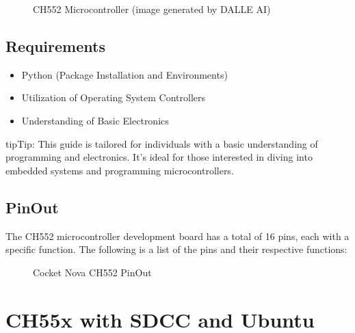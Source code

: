 \documentclass[letterpaper,10pt,english]{sphinxmanual}
\begin{document}
\begin{figure}[htbp]
\centering
\capstart

\noindent{}
\caption{CH552 Microcontroller (image generated by DALLE AI)}\label{\detokenize{about:id2}}\label{\detokenize{about:ch552}}\end{figure}


\section{Requirements}
\label{\detokenize{about:requirements}}\begin{itemize}
\item {} 
\sphinxAtStartPar
Python (Package Installation and Environments)

\item {} 
\sphinxAtStartPar
Utilization of Operating System Controllers

\item {} 
\sphinxAtStartPar
Understanding of Basic Electronics

\end{itemize}

\begin{sphinxadmonition}{tip}{Tip:}
\sphinxAtStartPar
This  guide is tailored for individuals with a basic understanding of programming and electronics. It’s ideal for those interested in diving into embedded systems and programming microcontrollers.
\end{sphinxadmonition}


\section{PinOut}
\label{\detokenize{about:pinout}}
\sphinxAtStartPar
The CH552 microcontroller development board has a total of 16 pins, each with a specific function. The following is a list of the pins and their respective functions:

\begin{figure}[htbp]
\centering
\capstart

\noindent{}
\caption{Cocket Nova CH552 PinOut}\label{\detokenize{about:id3}}\label{\detokenize{about:id1}}\end{figure}

\sphinxstepscope


\chapter{CH55x with SDCC and Ubuntu}
\label{\detokenize{install_linux:ch55x-with-sdcc-and-ubuntu}}\label{\detokenize{install_linux::doc}}
\end{document}
